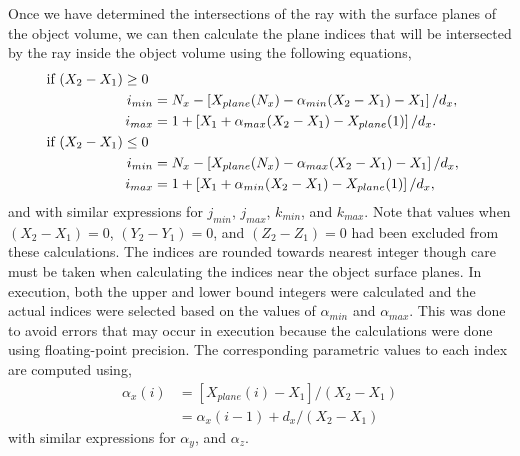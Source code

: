 Once we have determined the intersections of the ray with the surface planes of the object volume, we can then calculate the plane indices that will be intersected by the ray inside the object volume using the following equations, 
%
\begin{equation}
	\begin{aligned}
	\text{if $ (X_2 - X_1) \geq 0 $ }\\
	i_{min} &= N_x - \left[ X_{plane}(N_x) - \alpha_{min} (X_2 - X_1) - X_1 \right] /  d_x, \\
	i_{max} &= 1 + \left[ X_1 + \alpha_{max} (X_2 - X_1) - X_{plane}(1) \right] / d_x. \\
	\text{if $ (X_2 - X_1) \leq 0 $ }\\
	i_{min} &= N_x - \left[ X_{plane}(N_x) - \alpha_{max} (X_2 - X_1) - X_1 \right] /  d_x, \\
	i_{max} &= 1 + \left[ X_1 + \alpha_{min} (X_2 - X_1) - X_{plane}(1) \right] / d_x, 
	\end{aligned}
\label{eq:siddon_ijkminmax}
\end{equation}
%
and with similar expressions for $j_{min}$, $j_{max}$, $k_{min}$, and $k_{max}$.  Note that values when $(X_2 - X_1) = 0$, $(Y_2 - Y_1) = 0$, and $(Z_2 - Z_1) = 0$ had been excluded from these calculations.  The indices are rounded towards nearest integer though care must be taken when calculating the indices near the object surface planes.  In execution, both the upper and lower bound integers were calculated and the actual indices were selected based on the values of $\alpha_{min}$ and $\alpha_{max}$.  This was done to avoid errors that may occur in execution because the calculations were done using floating-point precision.  The corresponding parametric values to each index are computed using,
%
\begin{equation}
\begin{aligned}
\alpha_x(i) &= [ X_{plane}(i) - X_1 ] / (X_2 - X_1) \\
			&=\alpha_x(i-1) + d_x / (X_2 - X_1) \,
\end{aligned}
\label{ea:siddon_alphas}
\end{equation}
%
with similar expressions for $\alpha_y$, and $\alpha_z$.  

